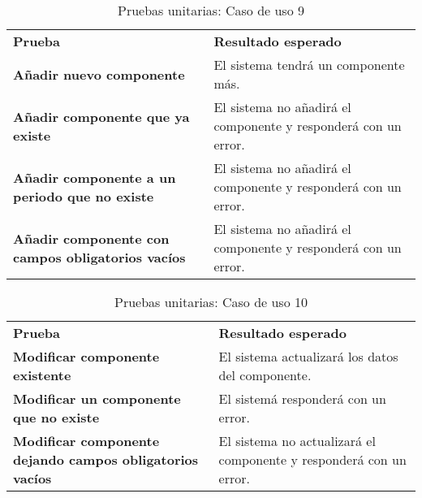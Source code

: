 \begin{table}[H]
\vspace{-4mm}
  \centering
  \caption{Pruebas unitarias: Caso de uso 9}
    \begin{tabular}{p{13em}p{23em}}
    \toprule
    \rowcolor[rgb]{ .851,  .886,  .953} \multicolumn{2}{p{36em}}{\textbf{Caso de uso 9: Añadir componente}} \\ \midrule
    \rowcolor[rgb]{ .949,  .949,  .949} \textbf{Prueba} &  \textbf{Resultado esperado}\\ \midrule
    \textbf{Añadir nuevo componente} & El sistema tendrá un componente más. \\ \midrule
    \textbf{Añadir componente que ya existe} & El sistema no añadirá el componente y responderá con un error.  \\ \midrule
    \textbf{Añadir componente a un periodo que no existe} & El sistema no añadirá el componente y responderá con un error.  \\ \midrule
    \textbf{Añadir componente con campos obligatorios vacíos} & El sistema no añadirá el componente y responderá con un error. \\ \bottomrule
    \end{tabular}%
\end{table}%
\begin{table}[H]
\vspace{-4mm}
  \centering
  \caption{Pruebas unitarias: Caso de uso 10}
    \begin{tabular}{p{13em}p{23em}}
    \toprule
    \rowcolor[rgb]{ .851,  .886,  .953} \multicolumn{2}{p{36em}}{\textbf{Caso de uso 10: Modificar componente}} \\ \midrule
    \rowcolor[rgb]{ .949,  .949,  .949} \textbf{Prueba} &  \textbf{Resultado esperado}\\ \midrule
    \textbf{Modificar componente existente} & El sistema actualizará los datos del componente. \\ \midrule
    \textbf{Modificar un componente que no existe} & El sistemá responderá con un error. \\ \midrule
    \textbf{Modificar componente dejando campos obligatorios vacíos} & El sistema no actualizará el componente y responderá con un error. \\ \bottomrule
    \end{tabular}%
\end{table}%
